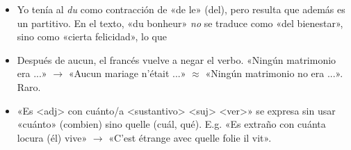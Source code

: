 \documentclass[a4paper, 12pt]{article}
\begin{document}
\begin{itemize}
    «su $x$»? Por ejemplo, «su amiga» $\to $ «son amie»?
\item Yo tenía al \textit{du} como contracción de «de le» (del), pero 
    resulta que además es un partitivo. En el texto, «du bonheur» \textit{no} se
    traduce como «del bienestar», sino como «cierta felicidad», lo que
\item Después de aucun, el francés vuelve a negar el verbo. «Ningún
    matrimonio era ...» $\to $ «Aucun mariage n'était ...» $\approx$ «Ningún
    matrimonio no era ...». Raro.
\item «Es <adj> con cuánto/a <sustantivo> <suj> <ver>» se expresa sin usar
    «cuánto» (combien) sino quelle (cuál, qué). E.g. «Es extraño con
    cuánta locura (él) vive» $\to $ «C'est étrange avec quelle folie il
    vit».
\end{itemize}
\end{document}
